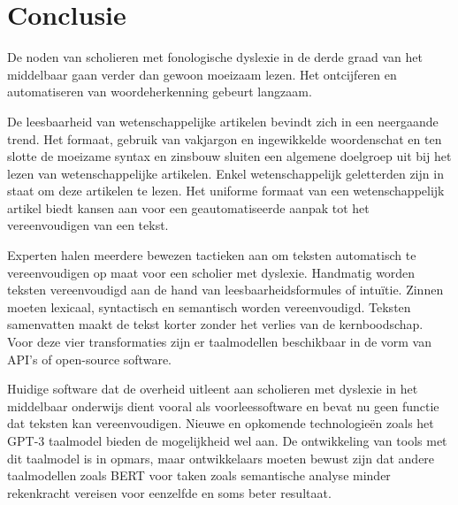\section{Conclusie}

De noden van scholieren met fonologische dyslexie in de derde graad van het middelbaar gaan verder dan gewoon moeizaam lezen. Het ontcijferen en automatiseren van woordeherkenning gebeurt langzaam. %

De leesbaarheid van wetenschappelijke artikelen bevindt zich in een neergaande trend. Het formaat, gebruik van vakjargon en ingewikkelde woordenschat en ten slotte de moeizame syntax en zinsbouw sluiten een algemene doelgroep uit bij het lezen van wetenschappelijke artikelen. Enkel wetenschappelijk geletterden zijn in staat om deze artikelen te lezen. Het uniforme formaat van een wetenschappelijk artikel biedt kansen aan voor een geautomatiseerde aanpak tot het vereenvoudigen van een tekst.

Experten halen meerdere bewezen tactieken aan om teksten automatisch te vereenvoudigen op maat voor een scholier met dyslexie. Handmatig worden teksten vereenvoudigd aan de hand van leesbaarheidsformules of intuïtie. Zinnen moeten lexicaal, syntactisch en semantisch worden vereenvoudigd. Teksten samenvatten maakt de tekst korter zonder het verlies van de kernboodschap. Voor deze vier transformaties zijn er taalmodellen beschikbaar in de vorm van API's of open-source software.

Huidige software dat de overheid uitleent aan scholieren met dyslexie in het middelbaar onderwijs dient vooral als voorleessoftware en bevat nu geen functie dat teksten kan vereenvoudigen. Nieuwe en opkomende technologieën zoals het GPT-3 taalmodel bieden de mogelijkheid wel aan. De ontwikkeling van tools met dit taalmodel is in opmars, maar ontwikkelaars moeten bewust zijn dat andere taalmodellen zoals BERT voor taken zoals semantische analyse minder rekenkracht vereisen voor eenzelfde en soms beter resultaat. 



